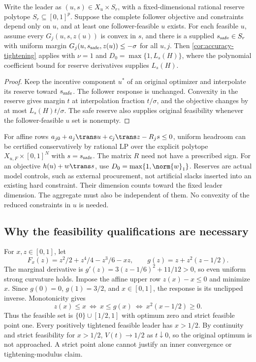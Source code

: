 \begin{corollary}
\label{cor:accuracy-reserve}
Write the leader as $(u,s)\in X_u\times S_r$, with a fixed-dimensional
rational reserve polytope $S_r\subseteq[0,1]^p$. Suppose the complete
follower objective and constraints depend only on $u$, and at least one
follower-feasible $u$ exists. For each feasible
$u$, assume every $G_j(u,s,z(u))$ is convex in $s$, and there is a
supplied $s_{\rm safe}\in S_r$ with uniform margin
$G_j(u,s_{\rm safe},z(u))\le-\sigma$ for all $u,j$.
Then \cref{cor:accuracy-tightening} applies with $\nu=1$ and
$D_0=\max\{1,L_s(H)\}$, where the polynomial coefficient bound for
reserve derivatives supplies $L_s(H)$.
\end{corollary}
\begin{proof}
Keep the incentive component $u^*$ of an original optimizer and
interpolate its reserve toward $s_{\rm safe}$. The follower response
is unchanged. Convexity in the reserve gives margin $t$ at interpolation
fraction $t/\sigma$, and the objective changes by at most
$L_s(H)t/\sigma$. The safe reserve also supplies original feasibility
whenever the follower-feasible $u$ set is nonempty.
\end{proof}

For affine rows $a_{j0}+a_j\trans u+c_j\trans z-R_js\le0$,
uniform headroom can be certified conservatively by rational LP over
the explicit polytope $X_{u,F}\times[0,1]^N$ with $s=s_{\rm safe}$.
The matrix $R$ need not have a prescribed sign. For an objective
$h(u)+w\trans s$, use $D_0=\max\{1,\norm{w}_1\}$. Reserves are
actual model controls, such as external procurement, not artificial
slacks inserted into an existing hard constraint. Their dimension counts
toward the fixed leader dimension. The aggregate must also be independent
of them. No convexity of the reduced constraints in $u$ is needed.

\subsection{Why the feasibility qualifications are necessary}
\label{subsec:accuracy-limits}

\begin{example}
\label{ex:accuracy-isolated-optimum}
For $x,z\in[0,1]$, let
\[
 F_x(z)=z^2/2+z^4/4-z^3/6-xz,\qquad
 g(z)=z+z^2(z-1/2).
\]
The marginal derivative is
$g'(z)=3(z-1/6)^2+11/12>0$, so even uniform strong curvature holds.
Impose the affine upper row $z(x)-x\le0$ and minimize $x$.
Since $g(0)=0$, $g(1)=3/2$, and $x\in[0,1]$, the response is its
unclipped inverse. Monotonicity gives
\[
 z(x)\le x\ \Longleftrightarrow\ x\le g(x)
                  \ \Longleftrightarrow\ x^2(x-1/2)\ge0.
\]
Thus the feasible set is $\{0\}\cup[1/2,1]$ with optimum zero and
strict feasible point one. Every positively tightened feasible leader
has $x>1/2$. By continuity and strict feasibility for $x>1/2$,
$V(t)\to1/2$ as $t\downarrow0$, so the original optimum is not
approached. A strict point alone cannot justify an inner convergence
or tightening-modulus claim.
\end{example}


